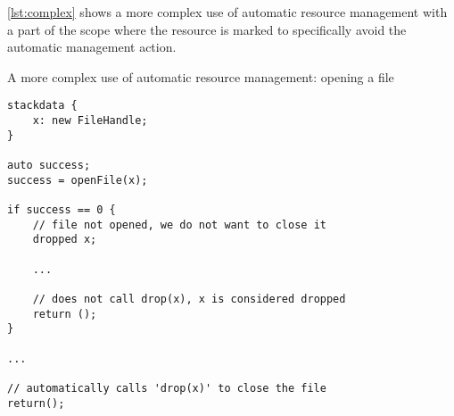 \cref{lst:complex} shows a more complex use of automatic resource management with a part of the scope where the resource is marked to specifically avoid the automatic management action.


\begin{codex}
    \caption{A more complex use of automatic resource management: opening a file}
    \label{lst:complex}
    \begin{lstlisting}
stackdata {
    x: new FileHandle;
}

auto success;
success = openFile(x);

if success == 0 {
    // file not opened, we do not want to close it
    dropped x;

    ...

    // does not call drop(x), x is considered dropped
    return ();
}

...

// automatically calls 'drop(x)' to close the file
return();
    \end{lstlisting}
\end{codex}
